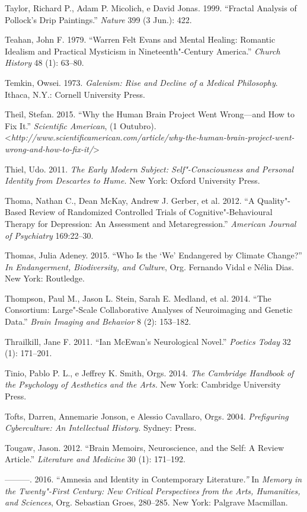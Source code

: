Taylor, Richard P., Adam P. Micolich, e David Jonas. 1999. ``Fractal
Analysis of Pollock's Drip Paintings.'' \emph{Nature} 399 (3 Jun.): 422.

Teahan, John F. 1979. ``Warren Felt Evans and Mental Healing: Romantic
Idealism and Practical Mysticism in Nineteenth"-Century America.''
\emph{Church History} 48 (1): 63--80.

Temkin, Owsei. 1973. \emph{Galenism: Rise and Decline of a Medical
Philosophy}. Ithaca, N.Y.: Cornell University Press.

Theil, Stefan. 2015. ``Why the Human Brain Project Went Wrong---and How
to Fix It.'' \emph{Scientific American}, (1 Outubro).
\textless{}\emph{http://www.scientificamerican.com/article/why-the-human-brain-project-went-wrong-and-how-to-fix-it/}\textgreater{}

Thiel, Udo. 2011. \emph{The Early Modern Subject: Self"-Consciousness and
Personal Identity from Descartes to Hume.} New York: Oxford University
Press.

Thoma, Nathan C., Dean McKay, Andrew J. Gerber, et al. 2012. ``A
Quality"-Based Review of Randomized Controlled Trials of
Cognitive"-Behavioural Therapy for Depression: An Assessment and
Metaregression.'' \emph{American Journal of Psychiatry} 169:22--30.

Thomas, Julia Adeney. 2015. ``Who Is the `We' Endangered by Climate
Change?'' \emph{In Endangerment, Biodiversity, and Culture}, Org.
Fernando Vidal e Nélia Dias. New York: Routledge.

Thompson, Paul M., Jason L. Stein, Sarah E. Medland, et al. 2014. ``The
 Consortium: Large"-Scale Collaborative Analyses of Neuroimaging
and Genetic Data.'' \emph{Brain Imaging and Behavior} 8 (2): 153--182.

Thrailkill, Jane F. 2011. ``Ian McEwan's Neurological Novel.''
\emph{Poetics Today} 32 (1): 171--201.

Tinio, Pablo P. L., e Jeffrey K. Smith, Orgs. 2014. \emph{The Cambridge
Handbook of the Psychology of Aesthetics and the Arts.} New York:
Cambridge University Press.

Tofts, Darren, Annemarie Jonson, e Alessio Cavallaro, Orgs. 2004.
\emph{Prefiguring Cyberculture: An Intellectual History.} Sydney: 
Press.

Tougaw, Jason. 2012. ``Brain Memoirs, Neuroscience, and the Self: A
Review Article.'' \emph{Literature and Medicine} 30 (1): 171--192.

---------. 2016. ``Amnesia and Identity in Contemporary
Literature\emph{.''} In \emph{Memory in the Twenty"-First Century: New
Critical Perspectives from the Arts, Humanities, and Sciences}, Org.
Sebastian Groes, 280--285. New York: Palgrave Macmillan.

